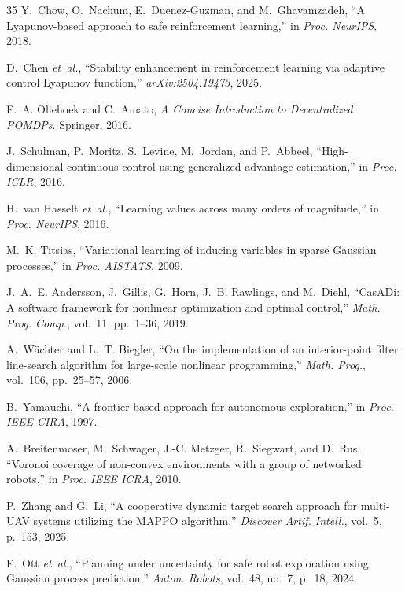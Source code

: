 \documentclass[letterpaper]{IEEEtran}
\begin{document}
\begin{thebibliography}{35}
Y.~Chow, O.~Nachum, E.~Duenez-Guzman, and M.~Ghavamzadeh, ``A Lyapunov-based approach to safe reinforcement learning,'' in \emph{Proc. NeurIPS}, 2018.

D.~Chen \emph{et~al.}, ``Stability enhancement in reinforcement learning via adaptive control Lyapunov function,'' \emph{arXiv:2504.19473}, 2025.

F.~A. Oliehoek and C.~Amato, \emph{A Concise Introduction to Decentralized POMDPs}. Springer, 2016.

J.~Schulman, P.~Moritz, S.~Levine, M.~Jordan, and P.~Abbeel, ``High-dimensional continuous control using generalized advantage estimation,'' in \emph{Proc. ICLR}, 2016.

H.~van Hasselt \emph{et~al.}, ``Learning values across many orders of magnitude,'' in \emph{Proc. NeurIPS}, 2016.

M.~K. Titsias, ``Variational learning of inducing variables in sparse Gaussian processes,'' in \emph{Proc. AISTATS}, 2009.

J.~A.~E. Andersson, J.~Gillis, G.~Horn, J.~B. Rawlings, and M.~Diehl, ``CasADi: A software framework for nonlinear optimization and optimal control,'' \emph{Math. Prog. Comp.}, vol.~11, pp.~1--36, 2019.

A.~W{\"a}chter and L.~T. Biegler, ``On the implementation of an interior-point filter line-search algorithm for large-scale nonlinear programming,'' \emph{Math. Prog.}, vol.~106, pp.~25--57, 2006.

B.~Yamauchi, ``A frontier-based approach for autonomous exploration,'' in \emph{Proc. IEEE CIRA}, 1997.

A.~Breitenmoser, M.~Schwager, J.-C. Metzger, R.~Siegwart, and D.~Rus, ``Voronoi coverage of non-convex environments with a group of networked robots,'' in \emph{Proc. IEEE ICRA}, 2010.

P.~Zhang and G.~Li, ``A cooperative dynamic target search approach for multi-UAV systems utilizing the MAPPO algorithm,'' \emph{Discover Artif. Intell.}, vol.~5, p.~153, 2025.

F.~Ott \emph{et~al.}, ``Planning under uncertainty for safe robot exploration using Gaussian process prediction,'' \emph{Auton. Robots}, vol.~48, no.~7, p.~18, 2024.

\end{thebibliography}
\end{document}
